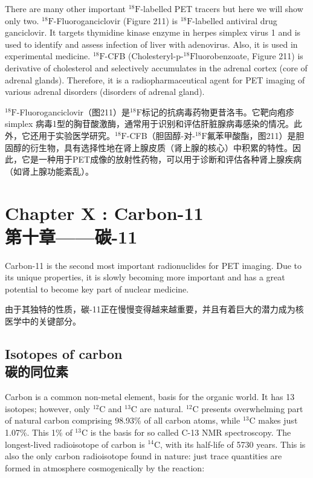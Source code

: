 \documentclass[dvipsnames, svgnames,a4paper,11pt]{article}
\begin{document}
There are many other important ${}^\mathrm{18}\mathrm{F}$-labelled PET tracers but here we will show only
two. ${}^\mathrm{18}\mathrm{F}$-Fluoroganciclovir (Figure 211) is ${}^\mathrm{18}\mathrm{F}$-labelled antiviral drug ganciclovir. It
targets thymidine kinase enzyme in herpes simplex virus 1 and is used to identify
and assess infection of liver with adenovirus. Also, it is used in experimental
medicine. ${}^\mathrm{18}\mathrm{F}$-CFB (Cholesteryl-p-${}^\mathrm{18}\mathrm{F}$luorobenzoate, Figure 211) is derivative of
cholesterol and selectively accumulates in the adrenal cortex (core of adrenal
glands). Therefore, it is a radiopharmaceutical agent for PET imaging of various
adrenal disorders (disorders of adrenal gland).


${}^\mathrm{18}\mathrm{F}$-Fluoroganciclovir（图211）是${}^\mathrm{18}\mathrm{F}$标记的抗病毒药物更昔洛韦。它靶向疱疹 simplex 病毒1型的胸苷酸激酶，通常用于识别和评估肝脏腺病毒感染的情况。此外，它还用于实验医学研究。${}^\mathrm{18}\mathrm{F}$-CFB（胆固醇-对-${}^\mathrm{18}\mathrm{F}$氟苯甲酸酯，图211）是胆固醇的衍生物，具有选择性地在肾上腺皮质（肾上腺的核心）中积累的特性。因此，它是一种用于PET成像的放射性药物，可以用于诊断和评估各种肾上腺疾病（如肾上腺功能紊乱）。

\newpage


\section{Chapter X :  Carbon-11 \\第十章——碳-11}

Carbon-11 is the second most important radionuclides for PET imaging. Due to its
unique properties, it is slowly becoming more important and has a great potential to
become key part of nuclear medicine.

由于其独特的性质，碳-11正在慢慢变得越来越重要，并且有着巨大的潜力成为核医学中的关键部分。

\subsection{Isotopes of carbon \\碳的同位素}
Carbon is a common non-metal element, basis for the organic world. It has 13
isotopes; however, only ${}^\mathrm{12}\mathrm{C}$ and ${}^\mathrm{13}\mathrm{C}$ are natural. ${}^\mathrm{12}\mathrm{C}$ presents overwhelming part of
natural carbon comprising 98.93\% of all carbon atoms, while ${}^\mathrm{13}\mathrm{C}$ makes just 1.07\%.
This 1\% of ${}^\mathrm{13}\mathrm{C}$ is the basis for so called C-13 NMR spectroscopy. The longest-lived
radioisotope of carbon is ${}^\mathrm{14}\mathrm{C}$, with its half-life of 5730 years. This is also the only
carbon radioisotope found in nature: just trace quantities are formed in atmosphere
cosmogenically by the reaction:
\end{document}
